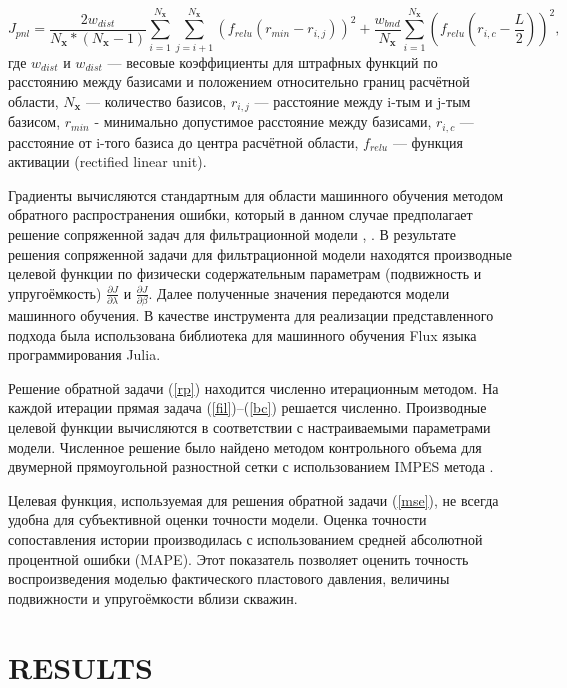 \documentclass{article}
\begin{document}
\begin{equation*} \label{pnl}
	J_{pnl}=\frac{2w_{dist}}{N_\textbf{x}*(N_\textbf{x}-1)}\sum_{i=1}^{N_\textbf{x}}{\sum_{j=i+1 }^{N_\textbf{x}}{\left(f_{relu}\left(r_{min} - r_{i,j}\right)\right)^2}} + 
	\frac{w_{bnd}}{N_\textbf{x}}\sum_{i=1}^{N_\textbf{x}}{\left(f_{relu}\left(r_{i,c} - \frac{L}{2}\right)\right)^2},
\end{equation*}
где $w_{dist}$ и $w_{dist}$ --- весовые коэффициенты для штрафных функций по расстоянию между базисами и положением относительно границ расчётной области, $N_\textbf{x}$ --- количество базисов, $r_{i,j}$ --- расстояние между i-тым и j-тым базисом,  $r_{min}$ - минимально допустимое расстояние между базисами,  $r_{i,c}$ --- расстояние от i-того базиса до центра расчётной области, $f_{relu}$ --- функция активации (rectified linear unit).

Градиенты вычисляются стандартным для области машинного обучения методом обратного распространения ошибки, который в данном случае предполагает решение сопряженной задач для фильтрационной модели \cite{kos3}, \cite{far}. 
В результате решения сопряженной задачи для фильтрационной модели находятся производные целевой функции по физически содержательным параметрам (подвижность и упругоёмкость) $\frac{\partial J}{\partial \lambda}$ и $\frac{\partial J}{\partial \beta}$. Далее полученные значения передаются модели машинного обучения. В качестве инструмента для реализации представленного подхода была использована библиотека для машинного обучения Flux \cite{inn} языка программирования Julia.

Решение обратной задачи (\ref{rp}) находится численно
итерационным методом. На каждой итерации прямая задача
(\ref{fil})--(\ref{bc}) решается численно. Производные
целевой функции вычисляются в соответствии с настраиваемыми
параметрами модели. Численное решение было найдено
методом контрольного объема для двумерной прямоугольной
разностной сетки с использованием IMPES метода \cite{azi}.

Целевая функция, используемая для решения обратной задачи ({\ref{mse}}), не всегда удобна для субъективной оценки точности модели. Оценка точности сопоставления истории производилась с использованием средней абсолютной процентной ошибки (MAPE). Этот показатель позволяет оценить точность воспроизведения моделью фактического пластового давления, величины подвижности и упругоёмкости вблизи скважин.


\section{RESULTS}
\end{document}
